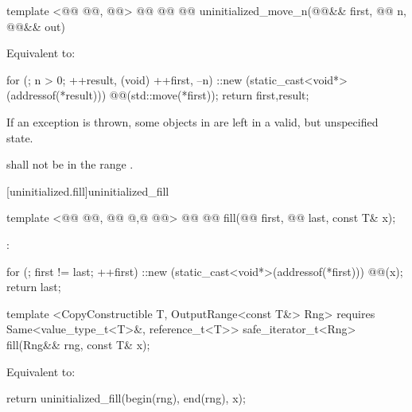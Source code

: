 \begin{codeblock}
  template <@@ @@, @@>
    @@
             @@
  @@
    uninitialized_move_n(@@&& first, @@ n, @@&& out)
\end{codeblock}


\pnum
\effects Equivalent to:
\begin{codeblock}
        for (; n > 0; ++result, (void) ++first, --n)
          ::new (static_cast<void*>(addressof(*result)))
            @@(std::move(*first));
        return {first,result};
\end{codeblock}

\pnum
\remarks If an exception is thrown, some objects in \tcode{[first, next(first, n))} are left in a valid, but unspecified state.

{\color{addclr}
\pnum
\requires {} shall not be in the range \tcode{[first, next(first, n))}.
} %

[uninitialized.fill]{uninitialized_fill}
\begin{codeblock}
  template <@@ @@, @@ @,@
            @@>
    @@
    @@ fill(@@ first, @@ last, const T& x);
\end{codeblock}

\setcounter{Paras}{0}
\pnum
\effects {}:
\begin{codeblock}
        for (; first != last; ++first)
           ::new (static_cast<void*>(addressof(*first)))
              @@(x);
        return last;
\end{codeblock}
{\color{addclr}
\begin{codeblock}
  template <CopyConstructible T, OutputRange<const T&> Rng>
    requires Same<value_type_t<T>&, reference_t<T>>
  safe_iterator_t<Rng>
    fill(Rng&& rng, const T& x);
\end{codeblock}

\pnum
\effects Equivalent to:
\begin{codeblock}
        return uninitialized_fill(begin(rng), end(rng), x);
\end{codeblock}
} %


